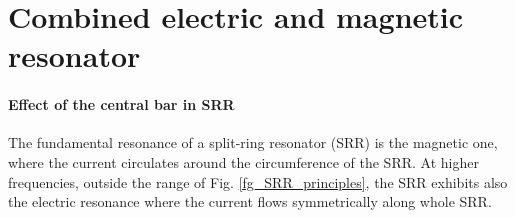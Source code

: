 


\FloatBarrier %
\section{Combined electric and magnetic resonator} \label{section_srr} %
\paragraph{Effect of the central bar in SRR}
The fundamental resonance of a split-ring resonator (SRR) is the magnetic one, where the current circulates around the circumference of the SRR. At higher frequencies, outside the range of Fig. \ref{fg_SRR_principles}, the SRR exhibits also the electric resonance where the current flows symmetrically along whole SRR.

